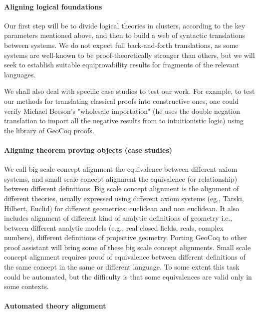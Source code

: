 \paragraph{Aligning logical foundations}

Our first step will be to divide logical theories in clusters,
according to the key parameters mentioned above, and then to build a
web of syntactic translations between systems. We do not expect full
back-and-forth translations, as some systems are well-known to be
proof-theoretically stronger than others, but we will seek to
establish suitable equiprovability results for fragments of the
relevant languages.

We shall also deal with specific case studies to test our work.  For
example, to test our methods for translating classical proofs into
constructive ones, one could verify Michael Beeson's "wholesale
importation" (he uses the double negation translation to import all
the negative results from \cite{} to intuitionistic logic) using the
library of GeoCoq proofs.

\paragraph{Aligning theorem proving objects (case studies)}

We call big scale concept alignment the equivalence between different
axiom systems, and small scale concept alignment the equivalence (or
relationship) between different definitions.  Big scale concept
alignment is the alignment of different theories, usually expressed
using different axiom systems (eg., Tarski, Hilbert, Euclid) for
different geometries: euclidean and non euclidean. It also includes
alignment of different kind of analytic definitions of geometry i.e.,
between different analytic models (e.g., real closed fields, reals,
complex numbers), different definitions of projective
geometry. Porting GeoCoq to other proof assistant will bring some of
these big scale concept alignments.  Small scale concept alignment
requires proof of equivalence between different definitions of the
same concept in the same or different language.  To some extent this
task could be automated, but the difficulty is that some equivalences
are valid only in some contexts.

\paragraph{Automated theory alignment}

